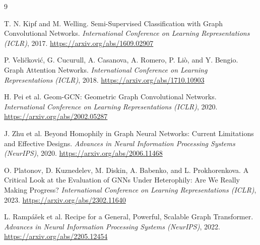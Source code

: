 \documentclass[12pt,a4paper]{article}
\numberwithin{equation}{section}
\theoremstyle{definition}
\begin{document}
\renewcommand{\refname}{Tài liệu tham khảo}
{}
\begin{thebibliography}{9}

T. N. Kipf and M. Welling.
Semi-Supervised Classification with Graph Convolutional Networks.
\textit{International Conference on Learning Representations (ICLR)}, 2017.
\url{https://arxiv.org/abs/1609.02907}

P. Veli\v{c}kovi\'c, G. Cucurull, A. Casanova, A. Romero, P. Li\`o,
and Y. Bengio.
Graph Attention Networks.
\textit{International Conference on Learning Representations (ICLR)}, 2018.
\url{https://arxiv.org/abs/1710.10903}

H. Pei et al.
Geom-GCN: Geometric Graph Convolutional Networks.
\textit{International Conference on Learning Representations (ICLR)}, 2020.
\url{https://arxiv.org/abs/2002.05287}

J. Zhu et al.
Beyond Homophily in Graph Neural Networks: Current Limitations and
Effective Designs.
\textit{Advances in Neural Information Processing Systems (NeurIPS)}, 2020.
\url{https://arxiv.org/abs/2006.11468}

O. Platonov, D. Kuznedelev, M. Diskin, A. Babenko, and L. Prokhorenkova.
A Critical Look at the Evaluation of GNNs Under Heterophily:
Are We Really Making Progress?
\textit{International Conference on Learning Representations (ICLR)}, 2023.
\url{https://arxiv.org/abs/2302.11640}

L. Ramp\'a\v{s}ek et al.
Recipe for a General, Powerful, Scalable Graph Transformer.
\textit{Advances in Neural Information Processing Systems (NeurIPS)}, 2022.
\url{https://arxiv.org/abs/2205.12454}

\end{thebibliography}
\end{document}
